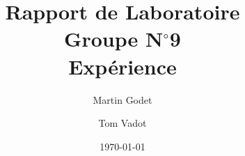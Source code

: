 \documentclass[a4paper, 12pt, oneside]{article}
\begin{document}
\title{Rapport de Laboratoire\\Groupe N$^\circ$9\\Expérience}
\author{Martin Godet \and Tom Vadot}
\date{\today}

\maketitle







\nocite{*}  %
\printbibliography

\newpage

\begin{appendices}

\end{appendices}
\end{document}
